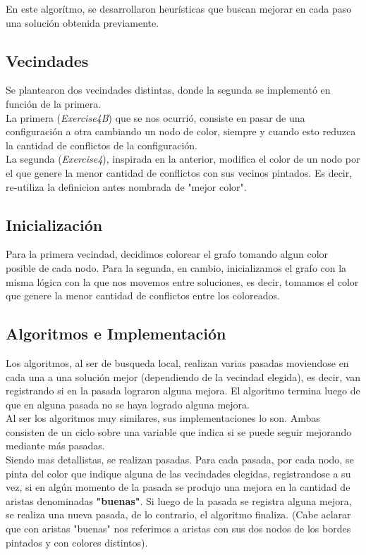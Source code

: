 En este algorítmo, se desarrollaron heurísticas que buscan mejorar en cada paso una solución obtenida previamente.\\

\subsection{Vecindades}
Se plantearon dos vecindades distintas, donde la segunda se implementó en función de la primera. \\
La primera (\textit{Exercise4B}) que se nos ocurrió, consiste en pasar de una configuración a otra cambiando un nodo de color, siempre y cuando esto reduzca la cantidad de conflictos de la configuración.\\
La segunda (\textit{Exercise4}), inspirada en la anterior, modifica el color de un nodo por el que genere la menor cantidad de conflictos con sus vecinos pintados. Es decir, re-utiliza la definicion antes nombrada de "mejor color".

\subsection{Inicialización}
Para la primera vecindad, decidimos colorear el grafo tomando algun color posible de cada nodo. Para la segunda, en cambio, inicializamos el grafo con la misma lógica con la que nos movemos entre soluciones, es decir, tomamos el color que genere la menor cantidad de conflictos entre los coloreados.

\subsection{Algoritmos e Implementación}

Los algoritmos, al ser de busqueda local, realizan varias pasadas moviendose en cada una a una solución mejor (dependiendo de la vecindad elegida), es decir, van registrando si en la pasada lograron alguna mejora. El algoritmo termina luego de que en alguna pasada no se haya logrado alguna mejora. \\

Al ser los algoritmos muy similares, sus implementaciones lo son. Ambas consisten de un ciclo sobre una variable que indica si se puede seguir mejorando mediante más pasadas. \\

Siendo mas detallistas, se realizan pasadas. Para cada pasada, por cada nodo, se pinta del color que indique alguna de las vecindades elegidas, registrandose a su vez, si en algún momento de la pasada se produjo una mejora en la cantidad de aristas denominadas \textbf{"buenas"}. Si luego de la pasada se registra alguna mejora, se realiza una nueva pasada, de lo contrario, el algoritmo finaliza. (Cabe aclarar que con aristas "buenas" nos referimos a aristas con sus dos nodos de los bordes pintados y con colores distintos).\\

